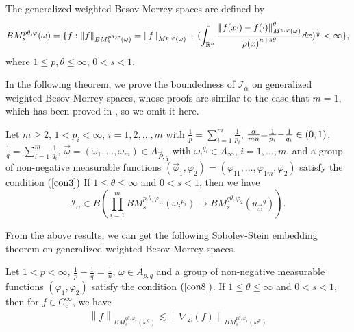 \documentclass[11pt, twoside, leqno]{article}
\begin{document}
\begin{defn}
	The generalized weighted Besov-Morrey spaces are defined by
	\begin{align*}
	BM_s^{p\theta ,\varphi }(\omega ) = \{ f:{\left\| f \right\|_{BM_s^{p\theta ,\varphi }(\omega )}} = {\left\| f \right\|_{M_{}^{p,\varphi }(\omega )}} + {(\int_{{\mathbb R^n}} {\frac{{\left\| {f(x \cdot ) - f( \cdot )} \right\|_{M_{}^{p,\varphi }(\omega )}^\theta }}{{\rho {{(x)}^{n + s\theta }}}}} dx)^{\frac{1}{\theta }}} < \infty \},
	\end{align*}
	where $1 \le p,\theta  \le \infty$, $0 < s < 1$.
\end{defn}

In the following theorem, we prove the boundedness of ${\mathcal I}_\alpha$ on generalized weighted Besov-Morrey spaces, whose proofs are similar to the case that $m=1$, which has been proved in \cite{Gu8}, so we omit it here.

\begin{thm}
	Let $m\geq 2$, $1< p_i<\infty$, $i=1,2,\ldots,m$ with $\frac{1}{p} = \sum\limits_{i = 1}^m {\frac{1}{{{p_i}}}}$,  $\frac{\alpha }{{mn}}{\rm{ = }}\frac{1}{{{p_i}}}{\rm{ - }}\frac{1}{{{q_i}}} \in (0,1)$, $\frac{1}{q} = \sum\limits_{i = 1}^m {\frac{1}{{{q_i}}}}$, $\vec{\omega}=(\omega_1,\ldots,\omega_m) \in {A_{\vec P,q}}$ with ${\omega _i}^{{q_i}} \in {A_\infty }$, $i = 1, \ldots ,m$, and a group of non-negative measurable functions $({{\vec \varphi }_1},{\varphi _2}) = ({\varphi _{11}}, \ldots ,{\varphi _{1m}},{\varphi _2})$ satisfy the condition $(\ref{con3})$
	If $1 \le \theta  \le \infty$ and $0 < s < 1$, then we have 
	$${{\mathcal I}_\alpha } \in B\left( {\prod\limits_{i = 1}^m {BM_s^{{p_i}\theta ,{\varphi _{1i}}}({\omega _i}^{{p_i}})}  \to BM_s^{q\theta ,{\varphi _2}}({u_{\vec \omega }}^q)} \right).$$
\end{thm}

From the above results, we can get the following Sobolev-Stein embedding theorem on generalized weighted Besov-Morrey spaces.

\begin{thm}
	Let $1 < p < \infty$, $\frac{1}{p} - \frac{1}{q} = \frac{1}{n}$, $\omega  \in {A_{p,q}}$ and a group of non-negative measurable functions $({{\varphi }_1},{\varphi _2})$ satisfy the condition $(\ref{con8})$.
	If $1 \le \theta  \le \infty$ and $0 < s < 1$, then for $f \in C_c^\infty $, we have 
	\begin{align*}
	{\left\| f \right\|_{BM_s^{q\theta ,{\varphi _2}}({\omega ^q})}} \lesssim {\left\| {{\nabla _{\mathcal L}}(f)} \right\|_{BM_s^{p\theta ,{\varphi _1}}({\omega ^p})}}
	\end{align*}
\end{thm}
\end{document}
